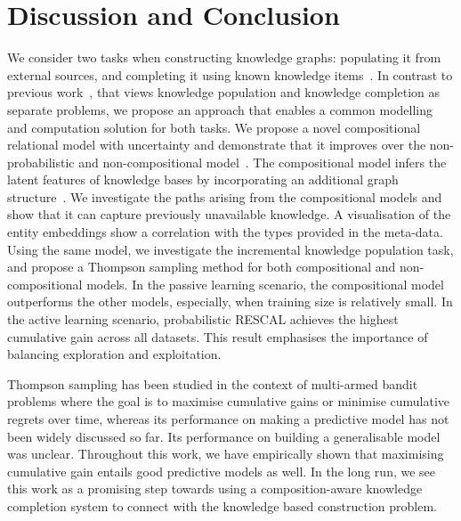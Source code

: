 \section{Discussion and Conclusion}
We consider two tasks when constructing knowledge graphs:
populating it from external sources,
and completing it using known knowledge items~\cite{dong2014knowledge}.
In contrast to previous work~\cite{kajino2015active}, that
views knowledge population and knowledge completion as separate problems,
we propose an approach that enables a common modelling and computation solution
for both tasks.
We propose a novel compositional relational model with uncertainty and
demonstrate that it improves over the non-probabilistic and non-compositional
model~\cite{nickel2011three}.
The compositional model infers the latent features of knowledge
bases by incorporating an additional graph structure~\cite{guu2015traversing}.
We investigate the paths arising from the compositional
models and show that it can capture previously unavailable knowledge. A visualisation
of the entity embeddings show a correlation with the types provided in the meta-data.
Using the same model, we investigate the incremental knowledge population task, and propose
a Thompson sampling method for both compositional and non-compositional models.
In the passive learning scenario, the compositional model outperforms the other models,
especially, when training size is relatively small.
In the active learning scenario, probabilistic RESCAL achieves the highest
cumulative gain across all datasets. This result emphasises the
importance of balancing exploration and exploitation.

Thompson sampling has been studied in the context of multi-armed bandit
problems where the goal is to maximise cumulative gains or minimise cumulative
regrets over time, whereas its performance on making a predictive model has not
been widely discussed so far. Its performance on building a generalisable model
was unclear. Throughout this work, we have empirically shown that maximising
cumulative gain entails good predictive models as well.
In the long run, we see this work as a promising step towards using a composition-aware knowledge
completion system to connect with the
knowledge based construction problem. %
